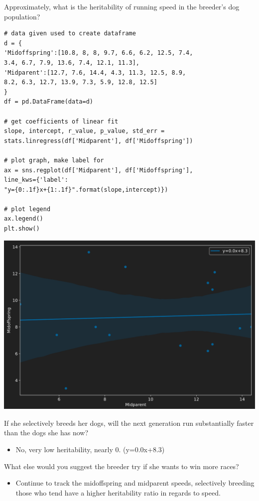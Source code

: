 \documentclass[12pt,a4paper]{article}
\begin{document}
\begin{enumerate}
    {\color{G-Moon}\item Approximately, what is the heritability of running speed in the breeder’s dog population?}
{\small\begin{lstlisting}
# data given used to create dataframe
d = {
'Midoffspring':[10.8, 8, 8, 9.7, 6.6, 6.2, 12.5, 7.4,
3.4, 6.7, 7.9, 13.6, 7.4, 12.1, 11.3], 
'Midparent':[12.7, 7.6, 14.4, 4.3, 11.3, 12.5, 8.9,
8.2, 6.3, 12.7, 13.9, 7.3, 5.9, 12.8, 12.5]
}
df = pd.DataFrame(data=d)

# get coefficients of linear fit
slope, intercept, r_value, p_value, std_err = 
stats.linregress(df['Midparent'], df['Midoffspring'])

# plot graph, make label for
ax = sns.regplot(df['Midparent'], df['Midoffspring'], 
line_kws={'label':
"y={0:.1f}x+{1:.1f}".format(slope,intercept)})

# plot legend
ax.legend()
plt.show()
\end{lstlisting}}
\begin{center}
    \includegraphics[scale=0.35]{images/heritability.png}
\end{center}
    {\color{G-Moon}\item If she selectively breeds her dogs, will the next generation run substantially faster than the dogs she has now?}
        \begin{itemize}
            \item No, very low heritability, nearly 0. (y=0.0x+8.3)
        \end{itemize}
    {\color{G-Moon}\item What else would you suggest the breeder try if she wants to win more races?}
        \begin{itemize}
            \item Continue to track the midoffspring and midparent speeds, selectively breeding those who tend have a higher heritability ratio in regards to speed.
        \end{itemize}
\end{enumerate}
\end{document}
